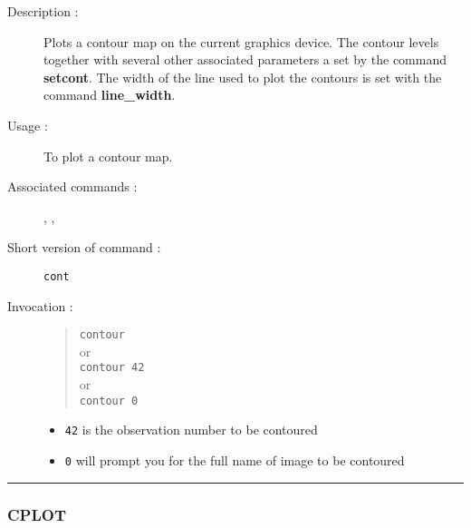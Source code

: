 \begin{description}

\item[Description :] Plots a contour map on the current graphics
device.  The contour levels together with several other associated
parameters a set by the command {\bf setcont}.  The width of the line
used to plot the contours is set with the command {\bf line\_width}.

\item[Usage :] To plot a contour map.
\item[Associated commands :] {\tt {}},
{\tt {}}, {\tt {}}
\item[Short version of command :] {\tt cont}
\item[Invocation :]

\begin{quote}{\tt  contour }\\
or \\
{\tt contour 42 }\\
or \\
{\tt contour 0 }
\end{quote}

\begin{itemize}
\item {\tt 42} is the observation number to be contoured
\item {\tt 0} will prompt you for the full name of image to be contoured
\end{itemize}

\end{description}

\hrule
\subsubsection*{\label{CPLOT}CPLOT}

